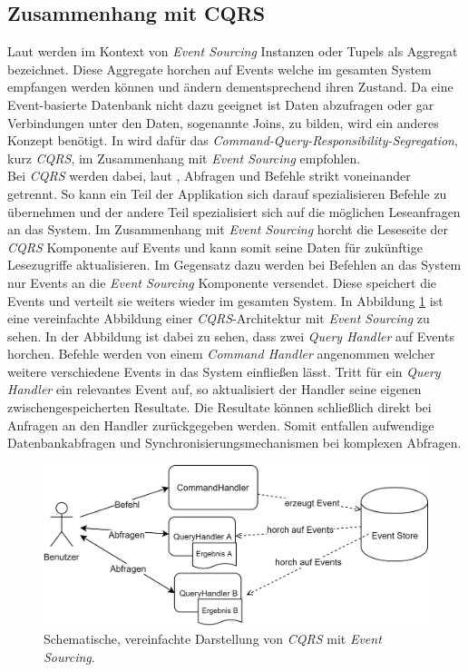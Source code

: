 \subsection{Zusammenhang mit CQRS}
Laut \cite{vernon2013implementing} werden im Kontext von \textit{Event Sourcing} Instanzen oder Tupels als Aggregat bezeichnet. Diese Aggregate horchen auf  Events welche im gesamten System empfangen werden können und ändern dementsprechend ihren Zustand. Da eine Event-basierte Datenbank nicht dazu geeignet ist Daten abzufragen oder gar Verbindungen unter den Daten, sogenannte Joins, zu bilden, wird ein anderes Konzept benötigt. In \cite{vernon2013implementing} wird dafür das \textit{Command-Query-Responsibility-Segregation}, kurz \textit{CQRS}, im Zusammenhang mit \textit{Event Sourcing} empfohlen. \\
Bei \textit{CQRS} werden dabei, laut \cite{cqrsYoung2010}, Abfragen und  Befehle strikt voneinander getrennt. So kann ein Teil der Applikation sich darauf spezialisieren Befehle zu übernehmen und der andere Teil spezialisiert sich auf die möglichen Leseanfragen an das System. Im Zusammenhang mit \textit{Event Sourcing} horcht die Leseseite der \textit{CQRS} Komponente auf Events und kann somit seine Daten für zukünftige Lesezugriffe aktualisieren. Im Gegensatz dazu werden bei Befehlen an das System nur Events an die \textit{Event Sourcing} Komponente versendet. Diese speichert die Events und verteilt sie weiters wieder im gesamten System. In Abbildung \ref{fig:transactionTheory:eventSourcing:cqrs} ist eine vereinfachte Abbildung einer \textit{CQRS}-Architektur mit \textit{Event Sourcing} zu sehen. In der Abbildung ist dabei zu sehen, dass zwei \textit{Query Handler} auf Events horchen. Befehle werden von einem \textit{Command Handler} angenommen welcher weitere verschiedene Events in das System einfließen lässt. Tritt für ein \textit{Query Handler} ein relevantes Event auf, so aktualisiert der Handler seine eigenen zwischengespeicherten Resultate. Die Resultate können schließlich direkt bei Anfragen an den Handler zurückgegeben werden. Somit entfallen aufwendige Datenbankabfragen und Synchronisierungsmechanismen bei komplexen Abfragen. \\
% 
% 
% 
\begin{figure}
    \centering
    \includegraphics[width=\linewidth]{gfx/other/eventSourcingCqrs}
    \caption{Schematische, vereinfachte Darstellung von \textit{CQRS} mit \textit{Event Sourcing}.}
    \label{fig:transactionTheory:eventSourcing:cqrs}
\end{figure}

